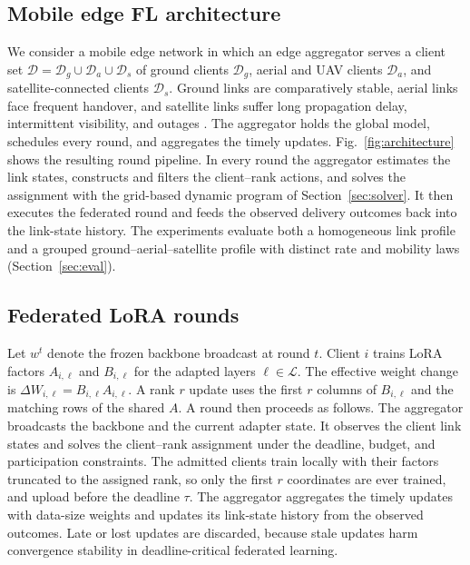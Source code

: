 \documentclass[preprint,12pt]{elsarticle}
\begin{document}
\subsection{Mobile edge FL architecture}
We consider a mobile edge network in which an edge aggregator serves a client set
$\mathcal{D}=\mathcal{D}_g\cup\mathcal{D}_a\cup\mathcal{D}_s$ of ground clients $\mathcal{D}_g$, aerial and UAV clients $\mathcal{D}_a$, and satellite-connected clients $\mathcal{D}_s$. Ground links are comparatively stable, aerial links face frequent handover, and satellite links suffer long propagation delay, intermittent visibility, and outages \cite{mahboob2024ntn,razmi2022ground}. The aggregator holds the global model, schedules every round, and aggregates the timely updates. Fig.~\ref{fig:architecture} shows the resulting round pipeline. In every round the aggregator estimates the link states, constructs and filters the client--rank actions, and solves the assignment with the grid-based dynamic program of Section~\ref{sec:solver}. It then executes the federated round and feeds the observed delivery outcomes back into the link-state history. The experiments evaluate both a homogeneous link profile and a grouped ground--aerial--satellite profile with distinct rate and mobility laws (Section~\ref{sec:eval}).

\subsection{Federated LoRA rounds}
Let $w^t$ denote the frozen backbone broadcast at round $t$. Client $i$ trains LoRA factors $A_{i,\ell}$ and $B_{i,\ell}$ for the adapted layers $\ell\in\mathcal L$. The effective weight change is $\Delta W_{i,\ell}=B_{i,\ell}A_{i,\ell}$. A rank $r$ update uses the first $r$ columns of $B_{i,\ell}$ and the matching rows of the shared $A$. A round then proceeds as follows. The aggregator broadcasts the backbone and the current adapter state. It observes the client link states and solves the client--rank assignment under the deadline, budget, and participation constraints. The admitted clients train locally with their factors truncated to the assigned rank, so only the first $r$ coordinates are ever trained, and upload before the deadline $\tau$. The aggregator aggregates the timely updates with data-size weights and updates its link-state history from the observed outcomes. Late or lost updates are discarded, because stale updates harm convergence stability in deadline-critical federated learning.
\end{document}
